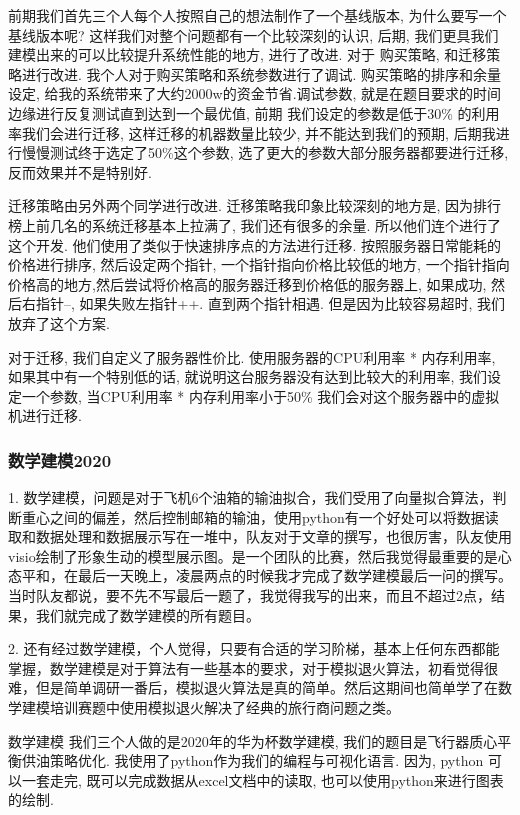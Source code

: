 \documentclass[UTF8]{ctexart}
\begin{document}
前期我们首先三个人每个人按照自己的想法制作了一个基线版本, 为什么要写一个基线版本呢? 这样我们对整个问题都有一个比较深刻的认识, 后期, 我们更具我们建模出来的可以比较提升系统性能的地方, 进行了改进.
对于 购买策略, 和迁移策略进行改进. 我个人对于购买策略和系统参数进行了调试. 购买策略的排序和余量设定, 给我的系统带来了大约2000w的资金节省.调试参数, 就是在题目要求的时间边缘进行反复测试直到达到一个最优值, 前期 我们设定的参数是低于30\% 的利用率我们会进行迁移, 这样迁移的机器数量比较少, 并不能达到我们的预期, 后期我进行慢慢测试终于选定了50\%这个参数, 选了更大的参数大部分服务器都要进行迁移, 反而效果并不是特别好. \par
迁移策略由另外两个同学进行改进. 迁移策略我印象比较深刻的地方是, 因为排行榜上前几名的系统迁移基本上拉满了, 我们还有很多的余量. 所以他们连个进行了这个开发.
他们使用了类似于快速排序点的方法进行迁移. 按照服务器日常能耗的价格进行排序, 然后设定两个指针, 一个指针指向价格比较低的地方, 一个指针指向价格高的地方,然后尝试将价格高的服务器迁移到价格低的服务器上, 如果成功, 然后右指针--, 如果失败左指针++. 直到两个指针相遇. 但是因为比较容易超时, 我们放弃了这个方案. \par
对于迁移, 我们自定义了服务器性价比. 使用服务器的CPU利用率 * 内存利用率, 如果其中有一个特别低的话, 就说明这台服务器没有达到比较大的利用率, 我们设定一个参数, 当CPU利用率 *  内存利用率小于50\% 我们会对这个服务器中的虚拟机进行迁移. \par
\subsubsection{数学建模2020}
1. 数学建模，问题是对于飞机6个油箱的输油拟合，我们受用了向量拟合算法，判断重心之间的偏差，然后控制邮箱的输油，使用python有一个好处可以将数据读取和数据处理和数据展示写在一堆中，队友对于文章的撰写，也很厉害，队友使用visio绘制了形象生动的模型展示图。是一个团队的比赛，然后我觉得最重要的是心态平和，在最后一天晚上，凌晨两点的时候我才完成了数学建模最后一问的撰写。当时队友都说，要不先不写最后一题了，我觉得我写的出来，而且不超过2点，结果，我们就完成了数学建模的所有题目。\par
2. 还有经过数学建模，个人觉得，只要有合适的学习阶梯，基本上任何东西都能掌握，数学建模是对于算法有一些基本的要求，对于模拟退火算法，初看觉得很难，但是简单调研一番后，模拟退火算法是真的简单。然后这期间也简单学了在数学建模培训赛题中使用模拟退火解决了经典的旅行商问题之类。\par

数学建模 
我们三个人做的是2020年的华为杯数学建模, 我们的题目是飞行器质心平衡供油策略优化. 我使用了python作为我们的编程与可视化语言. 因为, python 可以一套走完, 既可以完成数据从excel文档中的读取, 也可以使用python来进行图表的绘制. \par
\end{document}
